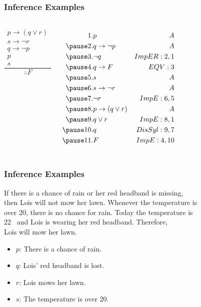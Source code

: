 \documentclass[dvipsnames]{beamer}
\begin{document}
\begin{frame}
  \frametitle{Inference Examples}

  \begin{columns}
    \[
    \frac
      {
        \begin{array}{c}
          p \rightarrow (q \vee r)\\
          s \rightarrow \neg r\\
          q \rightarrow \neg p\\
          p\\
          s
        \end{array}
      }
      {
        \therefore F
      }
    \]

    \pause
    \begin{eqnarray*}
      1. & p                        & A\\
      \pause
      2. & q \rightarrow \neg p     & A\\
      \pause
      3. & \neg q                   & ImpER:2,1\\
      \pause
      4. & q \rightarrow F          & EQV: 3\\
      \pause
      5. & s                        & A\\
      \pause
      6. & s \rightarrow \neg r     & A\\
      \pause
      7. & \neg r                   & ImpE:6,5\\
      \pause
      8. & p \rightarrow (q \vee r) & A\\
      \pause
      9. & q \vee r                 & ImpE:8,1\\
      \pause
      10. & q                       & DisSyl:9,7\\
      \pause
      11. & F                       & ImpE:4,10
    \end{eqnarray*}
  \end{columns}
\end{frame}

\begin{frame}
  \frametitle{Inference Examples}

  If there is a chance of rain or her red headband is missing,\\
  then Lois will not mow her lawn. Whenever the temperature is\\
  over 20\textcelsius, there is no chance for rain. Today the temperature is\\
  22\textcelsius ~ and Lois is wearing her red headband. Therefore,\\
  Lois will mow her lawn.

  \pause
  \medskip
  \begin{itemize}
    \item $p$: There is a chance of rain.
    \item $q$: Lois' red headband is lost.
    \item $r$: Lois mows her lawn.
    \item $s$: The temperature is over 20\textcelsius.
  \end{itemize}
\end{frame}
\end{document}
